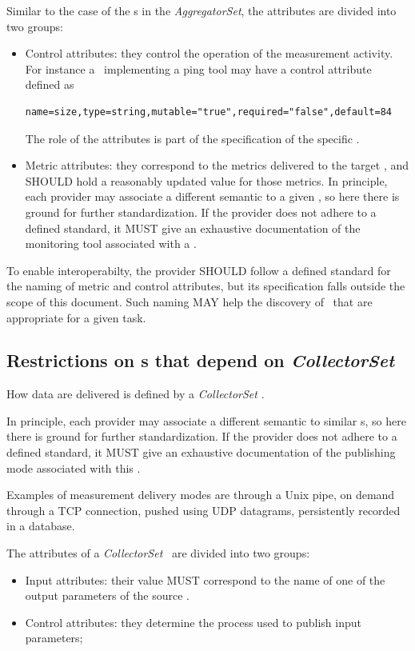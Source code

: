 \documentclass[12pt]{article}  %
\begin{document}
Similar to the case of the \mi s in the {\em AggregatorSet}, the attributes are divided into two groups:
\begin{itemize}
\item Control attributes: they control the operation of the measurement activity. For instance a \mi\ implementing a ping tool may have a control attribute defined as 
\begin{verbatim}
name=size,type=string,mutable="true",required="false",default=84
\end{verbatim}
The role of the attributes is part of the specification of the specific \mi.
\item Metric attributes: they correspond to the metrics delivered to the target \sens, and SHOULD hold a reasonably updated value for those metrics. In principle, each provider may associate a different semantic to a given \mi, so here there is ground for further standardization. If the provider does not adhere to a defined standard, it MUST give an exhaustive documentation of the monitoring tool associated with a \mi.
\end{itemize}

To enable interoperabilty, the provider SHOULD follow a defined standard for the naming of metric and control attributes, but its specification falls outside the scope of this document. Such naming MAY help the discovery of \mi\ that are appropriate for a given task.


\subsection{Restrictions on \mi s that depend on {\em CollectorSet} \label{sec:Collector}}

How data are delivered is defined by a {\em CollectorSet} \mi .

In principle, each provider may associate a different semantic to similar \mi s, so here there is ground for further standardization. If the provider does not adhere to a defined standard, it MUST give an exhaustive documentation of the publishing mode associated with this \mi.

Examples of measurement delivery modes are through a Unix pipe, on demand through a TCP connection, pushed using UDP datagrams, persistently recorded in a database.

The attributes of a {\em CollectorSet} \mi\ are divided into two groups:

\begin{itemize}
\item Input attributes: their value MUST correspond to the name of one of the output parameters of the source \sens .
\item Control attributes: they determine the process used to publish input parameters;
\end{itemize}
\end{document}
